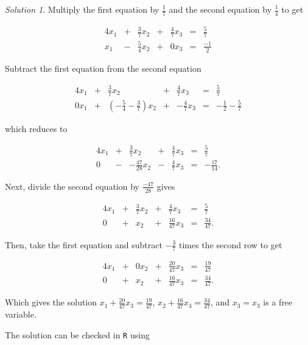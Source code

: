 \documentclass[
]{book}
\theoremstyle{definition}
\theoremstyle{definition}
\theoremstyle{definition}
\theoremstyle{definition}
\theoremstyle{remark}
\newtheorem*{solution}{Solution}
\begin{document}
\begin{solution}

Multiply the first equation by \(\frac{1}{7}\) and the second equation by \(\frac{1}{4}\) to get

\begin{alignat*}{4}
x_1 & {}+{} & \frac{3}{7} x_2 & {}+{} & \frac{4}{7} x_3 & {}={} & \frac{5}{7} \\
x_1 & {}-{} & \frac{5}{4} x_2 & {}+{} & 0 x_3       & {}={} & \frac{-1}{2}
\end{alignat*}

Subtract the first equation from the second equation

\begin{alignat*}{4}
x_1 & {}+{} & \frac{3}{7} x_2 & {}+{} & \frac{4}{7} x_3 & {}={} & \frac{5}{7} \\
0 x_1 & {}+{} &  (-\frac{5}{4} - \frac{3}{7}) x_2 &{}+{}& -\frac{4}{7} x_3  & {}={} & - \frac{1}{2} - \frac{5}{7}
\end{alignat*}

which reduces to

\begin{alignat*}{4}
x_1 & {}+{} & \frac{3}{7} x_2 & {}+{} & \frac{4}{7} x_3 & {}={} & \frac{5}{7} \\
0 & {}-{} &  -\frac{47}{28} x_2 &{}-{}& \frac{4}{7} x_3 & {}={} & -\frac{17}{14}.
\end{alignat*}

Next, divide the second equation by \(\frac{-47}{28}\) gives

\begin{alignat*}{4}
x_1 & {}+{} & \frac{3}{7} x_2 & {}+{} & \frac{4}{7} x_3 & {}={} & \frac{5}{7} \\
0 & {}+{} & x_2 &{}+{}& \frac{16}{47} x_3 & {}={} & \frac{34}{47}.
\end{alignat*}

Then, take the first equation and subtract \(-\frac{3}{7}\) times the second row to get

\begin{alignat*}{4}
x_1 & {}+{} & 0 x_2 & {}+{} & \frac{20}{47} x_3 & {}={} & \frac{19}{47} \\
0 & {}+{} & x_2 &{}+{}& \frac{16}{47} x_3 & {}={} & \frac{34}{47}.
\end{alignat*}

Which gives the solution
\(x_1 + \frac{20}{47} x_3 = \frac{19}{47}\), \(x_2 + \frac{16}{47} x_3 = \frac{34}{47}\), and \(x_3 = x_3\) is a free variable.

The solution can be checked in \texttt{R} using


\end{solution}
\end{document}

